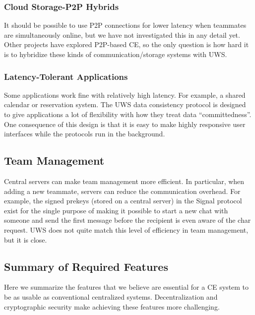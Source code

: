 \documentclass{article}
\begin{document}
\subsubsection{Cloud Storage-P2P Hybrids}

It should be possible to use P2P connections for lower latency when teammates are simultaneously online, but we have not investigated this in any detail yet.
Other projects have explored P2P-based CE, so the only question is how hard it is to hybridize these kinds of communication{\slash}storage systems with UWS.

\subsubsection{Latency-Tolerant Applications}

Some applications work fine with relatively high latency.
For example, a shared calendar or reservation system.
The UWS data consistency protocol is designed to give applications a lot of flexibility with how they treat data ``committedness''.
One consequence of this design is that it is easy to make highly responsive user interfaces while the protocols run in the background.

\subsection{Team Management}

Central servers can make team management more efficient.
In particular, when adding a new teammate, servers can reduce the communication overhead.
For example, the signed prekeys (stored on a central server) in the Signal protocol exist for the single purpose of making it possible to start a new chat with someone and send the first message before the recipient is even aware of the char request.
UWS does not quite match this level of efficiency in team management, but it is close.

\subsection{Summary of Required Features}

Here we summarize the features that we believe are essential for a CE system to be as usable as conventional centralized systems.
Decentralization and cryptographic security make achieving these features more challenging.
\end{document}
